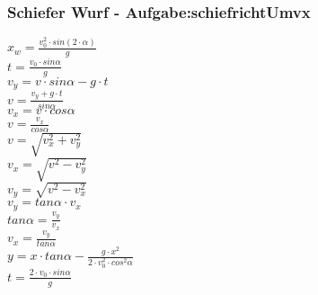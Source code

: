 \subsubsection{Schiefer Wurf  - Aufgabe:schiefrichtUmvx} 
\begin{minipage}{0.45\textwidth} 
$ x_{w}  = \frac{v_{0} ^{2} \cdot sin(2\cdot \alpha )}{       g} $\\ 
$ t =\frac{v_{0} \cdot sin \alpha }{  g} $\\ 
$ v_{y}  =  v\cdot sin\alpha - g\cdot t $\\ 
$ v= \frac{ v_{y} +g\cdot t}{ sin\alpha } $\\ 
$ v_{x}  = v\cdot  cos\alpha $\\ 
$ v= \frac{ v_{x} }{ cos\alpha } $\\ 
$ v= \sqrt{ v_{x} ^{2} + v_{y} ^{2} } $\\ 
$ v_{x} = \sqrt{ v^{2}  - v_{y} ^{2} } $\\ 
$ v_{y} = \sqrt{ v^{2}  - v_{x} ^{2} } $\\ 
$ v_{y} = tan \alpha \cdot  v_{x} $\\ 
$ tan \alpha = \frac{v_{y} }{v_{x} } $\\ 
$ v_{x} = \frac{v_{y} }{tan \alpha } $\\ 
$ y = x\cdot tan \alpha  - \frac{   g\cdot x^{2} }{2\cdot v^{2} _{0} \cdot cos ^{2}\alpha } $\\ 
$ t =\frac{2\cdot v_{0} \cdot sin \alpha }{ g} $\\ 
\end{minipage} 
\begin{minipage}{0.45\textwidth} 
 
\end{minipage} 
